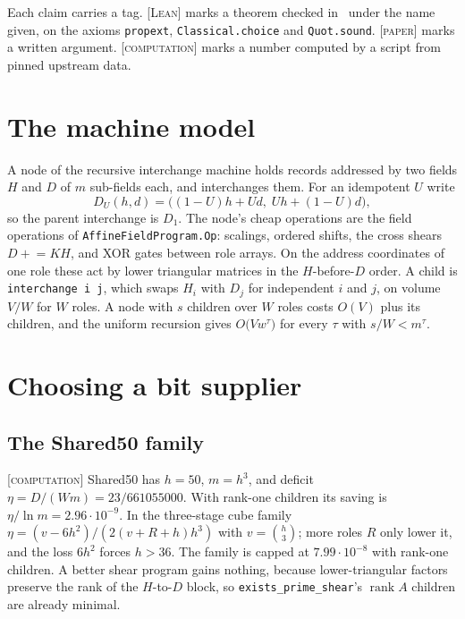 \documentclass[11pt]{amsart}
\theoremstyle{remark}
\newcommand{\lean}[1]{\texttt{#1}}
\newcommand{\tagL}{\textsc{[Lean]}}
\newcommand{\tagP}{\textsc{[paper]}}
\newcommand{\tagC}{\textsc{[computation]}}
\begin{document}
Each claim carries a tag. \tagL{} marks a theorem checked in~\cite{IMB} under the name given, on
the axioms \lean{propext}, \lean{Classical.choice} and \lean{Quot.sound}. \tagP{} marks a
written argument. \tagC{} marks a number computed by a script from pinned upstream data.

\section{The machine model}\label{sec:model}

A node of the recursive interchange machine holds records addressed by two fields $H$ and $D$ of
$m$ sub-fields each, and interchanges them. For an idempotent $U$ write
\[
  D_U(h, d) = \bigl((1-U)h + Ud,\; Uh + (1-U)d\bigr),
\]
so the parent interchange is $D_1$. The node's cheap operations are the field operations of
\lean{AffineFieldProgram.Op}: scalings, ordered shifts, the cross shears $D \mathrel{+}= KH$, and
XOR gates between role arrays. On the address coordinates of one role these act by lower
triangular matrices in the $H$-before-$D$ order. A child is \lean{interchange i j}, which swaps
$H_i$ with $D_j$ for independent $i$ and $j$, on volume $V/W$ for $W$ roles. A node with $s$
children over $W$ roles costs $O(V)$ plus its children, and the uniform recursion gives
$O\bigl(V w^{\tau}\bigr)$ for every $\tau$ with $s/W < m^{\tau}$.

\section{Choosing a bit supplier}\label{sec:choice}

\subsection{The Shared50 family}
\tagC{} Shared50 has $h = 50$, $m = h^3$, and deficit $\eta = D/(Wm) = 23/661055000$. With
rank-one children its saving is $\eta/\ln m = 2.96 \cdot 10^{-9}$. In the three-stage cube
family $\eta = (v - 6h^2)/(2(v+R+h)h^3)$ with $v = \binom{h}{3}$; more roles $R$ only lower it,
and the loss $6h^2$ forces $h > 36$. The family is capped at $7.99 \cdot 10^{-8}$ with rank-one
children. A better shear program gains nothing, because lower-triangular factors preserve the
rank of the $H$-to-$D$ block, so \lean{exists\_prime\_shear}'s $\operatorname{rank} A$ children
are already minimal.
\end{document}
